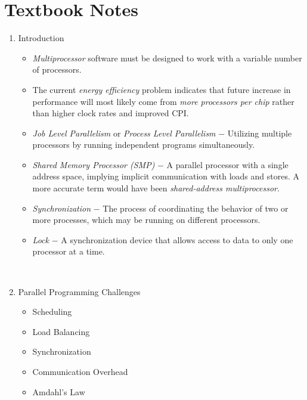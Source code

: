 \documentclass[12pt]{article}
\newenvironment{QandA}{\begin{enumerate}[label=\bfseries\arabic*.]\bfseries}
                      {\end{enumerate}}
\newenvironment{answered}{\par\quad\normalfont}{}
\begin{document}
\section{Textbook Notes}
\begin{QandA}

\item Introduction
\begin{answered}
\vspace{-0.85cm}
\begin{itemize}
    \item \textit{Multiprocessor} software must be designed to work with a variable number of processors.
    \item The current \textit{energy efficiency} problem indicates that future increase in performance will most likely come from \textit{more processors per chip} rather than higher clock rates and improved CPI.
    \item \textit{Job Level Parallelism} or \textit{Process Level Parallelism} $-$ Utilizing multiple processors by running independent programs simultaneously.
    \item \textit{Shared Memory Processor (SMP)} $-$ A parallel processor with a single address space, implying implicit communication with loads and stores. A more accurate term would have been \textit{shared-address multiprocessor}. 
    \item \textit{Synchronization} $-$ The process of coordinating the behavior of two or more processes, which may be running on different processors.
    \item \textit{Lock} $-$ A synchronization device that allows access to data to only one processor at a time. 
\end{itemize}
\end{answered}

\

\item Parallel Programming Challenges
\begin{answered}
\vspace{-0.85cm}
\begin{itemize}
    \item Scheduling
    \item Load Balancing
    \item Synchronization
    \item Communication Overhead
    \item Amdahl's Law
\end{itemize}
\end{answered}


\end{QandA}
\end{document}
